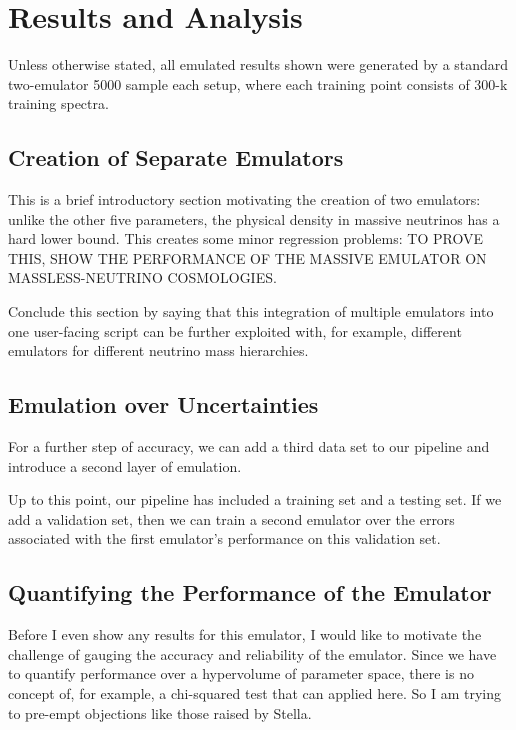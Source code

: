 \chapter{Results and Analysis}

Unless otherwise stated, all emulated results shown were generated by a standard two-emulator 5000 sample each setup, where each training point consists of 300-k training spectra.

\section{Creation of Separate Emulators}

This is a brief introductory section motivating the creation of two emulators: unlike the other five parameters, the physical density in massive neutrinos has a hard lower bound. This creates some minor regression problems: TO PROVE THIS, SHOW THE PERFORMANCE OF THE MASSIVE EMULATOR ON MASSLESS-NEUTRINO COSMOLOGIES.

Conclude this section by saying that this integration of multiple emulators into one user-facing script can be further exploited with, for example, different emulators for different neutrino mass hierarchies.

\section{Emulation over Uncertainties}

For a further step of accuracy, we can add a third data set to our pipeline
and introduce a second layer of emulation.

Up to this point, our pipeline has included a training set and a testing set.
If we add a validation set, then we can train a second emulator over the
errors associated with the first emulator's performance on this validation
set.

\section{Quantifying the Performance of the Emulator}

Before I even show any results for this emulator, I would like to motivate the challenge of gauging the accuracy and reliability of the emulator. Since we have to quantify performance over a hypervolume of parameter space, there is no concept of, for example, a chi-squared test that can applied here. So I am trying to pre-empt objections like those raised by Stella.

